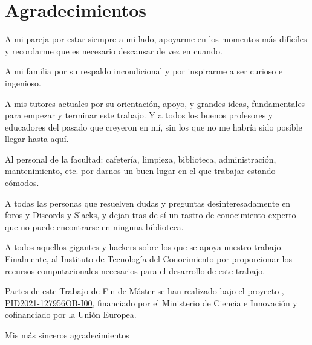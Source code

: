 \chapter*{Agradecimientos}

A mi pareja por estar siempre a mi lado, apoyarme en los momentos más difíciles y recordarme que es necesario descansar de vez en cuando.

A mi familia por su respaldo incondicional y por inspirarme a ser curioso e ingenioso.

A mis tutores actuales por su orientación, apoyo, y grandes ideas, fundamentales para empezar y terminar este trabajo. Y a todos los buenos profesores y educadores del pasado que creyeron en mí, sin los que no me habría sido posible llegar hasta aquí.

Al personal de la facultad: cafetería, limpieza, biblioteca, administración, mantenimiento, etc. por darnos un buen lugar en el que trabajar estando cómodos.

A todas las personas que resuelven dudas y preguntas desinteresadamente en foros y Discords y Slacks, y dejan tras de sí un rastro de conocimiento experto que no puede encontrarse en ninguna biblioteca.

A todos aquellos gigantes y hackers sobre los que se apoya nuestro trabajo.
\\[16pt]

Finalmente, al Instituto de Tecnología del Conocimiento por proporcionar los recursos computacionales necesarios para el desarrollo de este trabajo.

Partes de este Trabajo de Fin de Máster se han realizado bajo el proyecto , \href{https://produccioncientifica.ucm.es/proyectos/551171/detalle}{PID2021-127956OB-I00}, financiado por el Ministerio de Ciencia e Innovación y cofinanciado por la Unión Europea.

\begin{flushright}
    Mis más sinceros agradecimientos
\end{flushright}
